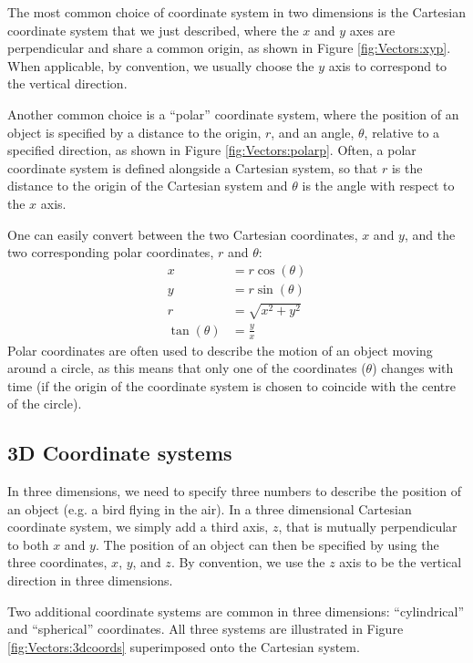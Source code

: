 The most common choice of coordinate system in two dimensions is the Cartesian coordinate system that we just described, where the $x$ and $y$ axes are perpendicular and share a common origin, as shown in Figure \ref{fig:Vectors:xyp}. When applicable, by convention, we usually choose the $y$ axis to correspond to the vertical direction.

Another common choice is a ``polar'' coordinate system, where the position of an object is specified by a distance to the origin, $r$, and an angle, $\theta$, relative to a specified direction, as shown in Figure \ref{fig:Vectors:polarp}. Often, a polar coordinate system is defined alongside a Cartesian system, so that $r$ is the distance to the origin of the Cartesian system and $\theta$ is the angle with respect to the $x$ axis.



One can easily convert between the two Cartesian coordinates, $x$ and $y$, and the two corresponding polar coordinates, $r$ and $\theta$:
\begin{align*}
x&=r\cos(\theta)\\
y&=r\sin(\theta)\\
r&=\sqrt{x^2+y^2}\\
\tan(\theta) &= \frac{y}{x}
\end{align*}
Polar coordinates are often used to describe the motion of an object moving around a circle, as this means that only one of the coordinates ($\theta$) changes with time (if the origin of the coordinate system is chosen to coincide with the centre of the circle).

\subsection{3D Coordinate systems}
In three dimensions, we need to specify three numbers to describe the position of an object (e.g. a bird flying in the air). In a three dimensional Cartesian coordinate system, we simply add a third axis, $z$, that is mutually perpendicular to both $x$ and $y$. The position of an object can then be specified by using the three coordinates, $x$, $y$, and $z$. By convention, we use the $z$ axis to be the vertical direction in three dimensions.

Two additional coordinate systems are common in three dimensions: ``cylindrical'' and ``spherical'' coordinates. All three systems are illustrated in Figure \ref{fig:Vectors:3dcoords} superimposed onto the Cartesian system.

